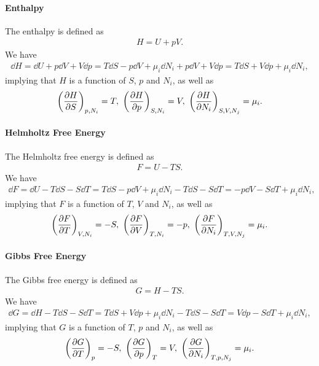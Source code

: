 \paragraph{Enthalpy}
The enthalpy is defined as 
\begin{align*}
	H = U + pV.
\end{align*}
We have
\begin{align*}
	\dd{H} = \dd{U} + p\dd{V} + V\dd{p} = T\dd{S} - p\dd{V} + \mu_{i}\dd{N_{i}} + p\dd{V} + V\dd{p} = T\dd{S} + V\dd{p} + \mu_{i}\dd{N_{i}},
\end{align*}
implying that $H$ is a function of $S$, $p$ and $N_{i}$, as well as
\begin{align*}
	\fix{\pdv{H}{S}}{p, N_{i}} = T,\ \fix{\pdv{H}{p}}{S, N_{i}} = V,\ \fix{\pdv{H}{N_{i}}}{S, V,  N_{j}} = \mu_{i}.
\end{align*}

\paragraph{Helmholtz Free Energy}
The Helmholtz free energy is defined as
\begin{align*}
	F = U - TS.
\end{align*}
We have
\begin{align*}
	\dd{F} = \dd{U} - T\dd{S} - S\dd{T} = T\dd{S} - p\dd{V} + \mu_{i}\dd{N_{i}} - T\dd{S} - S\dd{T} = -p\dd{V} - S\dd{T} + \mu_{i}\dd{N_{i}},
\end{align*}
implying that $F$ is a function of $T$, $V$ and $N_{i}$, as well as
\begin{align*}
	\fix{\pdv{F}{T}}{V, N_{i}} = -S,\ \fix{\pdv{F}{V}}{T, N_{i}} = -p,\ \fix{\pdv{F}{N_{i}}}{T, V,  N_{j}} = \mu_{i}.
\end{align*}

\paragraph{Gibbs Free Energy}
The Gibbs free energy is defined as
\begin{align*}
	G = H - TS.
\end{align*}
We have
\begin{align*}
	\dd{G} = \dd{H} - T\dd{S} - S\dd{T} = T\dd{S} + V\dd{p} + \mu_{i}\dd{N_{i}} - T\dd{S} - S\dd{T} = V\dd{p} - S\dd{T} + \mu_{i}\dd{N_{i}},
\end{align*}
implying that $G$ is a function of $T$, $p$ and $N_{i}$, as well as
\begin{align*}
	\fix{\pdv{G}{T}}{p} = -S,\ \fix{\pdv{G}{p}}{T} = V,\ \fix{\pdv{G}{N_{i}}}{T, p,  N_{j}} = \mu_{i}.
\end{align*}

